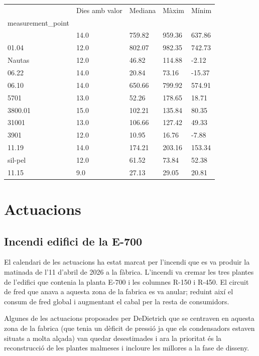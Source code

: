 \documentclass[
  paper=a4,
  oneside  ,captions=tableheading
]{scrartcl}
\newcounter{none}
\begin{document}
{\def\LTcaptype{none} %
\begin{longtable}[]{@{}lllll@{}}
\toprule\noalign{}
& Dies amb valor & Mediana & Màxim & Mínim \\
measurement\_point & & & & \\
\midrule\noalign{}
\endhead
\bottomrule\noalign{}
\endlastfoot
04.05 & 14.0 & 759.82 & 959.36 & 637.86 \\
01.04 & 12.0 & 802.07 & 982.35 & 742.73 \\
Nautas & 12.0 & 46.82 & 114.88 & -2.12 \\
06.22 & 14.0 & 20.84 & 73.16 & -15.37 \\
06.10 & 14.0 & 650.66 & 799.92 & 574.91 \\
5701 & 13.0 & 52.26 & 178.65 & 18.71 \\
3800.01 & 15.0 & 102.21 & 135.84 & 80.35 \\
31001 & 13.0 & 106.66 & 127.42 & 49.33 \\
3901 & 12.0 & 10.95 & 16.76 & -7.88 \\
11.19 & 14.0 & 174.21 & 203.16 & 153.34 \\
sil-pel & 12.0 & 61.52 & 73.84 & 52.38 \\
11.15 & 9.0 & 27.13 & 29.05 & 20.81 \\
\end{longtable}
}

\section{Actuacions}\label{actuacions}

\subsection{Incendi edifici de la
E-700}\label{incendi-edifici-de-la-e-700}

El calendari de les actuacions ha estat marcat per l'incendi que es va
produir la matinada de l'11 d'abril de 2026 a la fàbrica. L'incendi va
cremar les tres plantes de l'edifici que contenia la planta E-700 i les
columnes R-150 i R-450. El circuit de fred que anava a aquesta zona de
la fabrica es va anular; reduint així el consum de fred global i
augmentant el cabal per la resta de consumidors.

Algunes de les actuacions proposades per DeDietrich que se centraven en
aquesta zona de la fabrica (que tenia un dèficit de pressió ja que els
condensadors estaven situats a molta alçada) van quedar desestimades i
ara la prioritat és la reconstrucció de les plantes malmeses i incloure
les millores a la fase de disseny.
\end{document}
